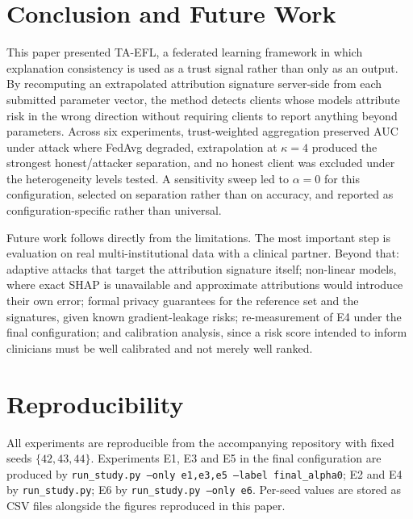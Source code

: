 \documentclass[conference]{IEEEtran}
\begin{document}
\section{Conclusion and Future Work}

This paper presented TA-EFL, a federated learning framework in which
explanation consistency is used as a trust signal rather than only as an
output. By recomputing an extrapolated attribution signature server-side from
each submitted parameter vector, the method detects clients whose models
attribute risk in the wrong direction without requiring clients to report
anything beyond parameters. Across six experiments, trust-weighted
aggregation preserved AUC under attack where FedAvg degraded, extrapolation
at $\kappa=4$ produced the strongest honest/attacker separation, and no
honest client was excluded under the heterogeneity levels tested. A
sensitivity sweep led to $\alpha=0$ for this configuration, selected on
separation rather than on accuracy, and reported as configuration-specific
rather than universal.

Future work follows directly from the limitations. The most important step is
evaluation on real multi-institutional data with a clinical partner. Beyond
that: adaptive attacks that target the attribution signature itself; non-linear
models, where exact SHAP is unavailable and approximate attributions would
introduce their own error; formal privacy guarantees for the reference set and
the signatures, given known gradient-leakage risks;
re-measurement of E4 under the final configuration; and calibration analysis,
since a risk score intended to inform clinicians must be well calibrated and
not merely well ranked.

\section*{Reproducibility}

All experiments are reproducible from the accompanying repository with fixed
seeds $\{42,43,44\}$. Experiments E1, E3 and E5 in the final configuration
are produced by \texttt{run\_study.py --only e1,e3,e5 --label final\_alpha0};
E2 and E4 by \texttt{run\_study.py}; E6 by
\texttt{run\_study.py --only e6}. Per-seed values are stored as CSV files
alongside the figures reproduced in this paper.



\end{document}
